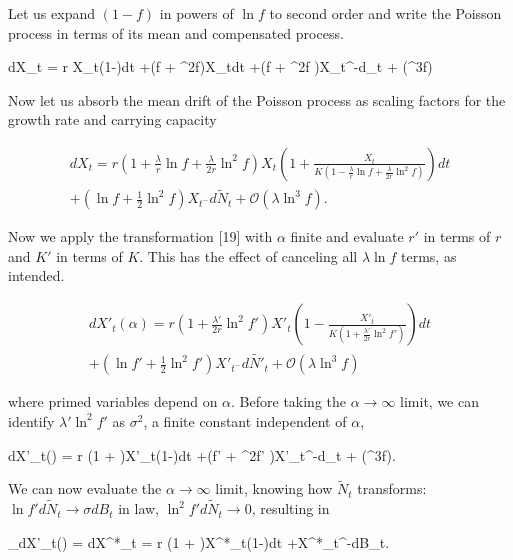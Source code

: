 \noindent Let us expand $(1-f)$ in powers of $\ln f$ to second order and write the Poisson process in terms of its mean and compensated process.

\be
dX_t = r X_t\left(1-\right)dt +\left(\ln f + \ln^2f\right)X_{t}\lambda dt +\left(\ln f + \ln^2f \right)X_{t^-}d_t + (\lambda\ln^3f)
\ee

\noindent Now let us absorb the mean drift of the Poisson process as scaling factors for the growth rate and carrying capacity

\begin{multline}
dX_t = r \left(1+\frac{\lambda}{r}\ln f + \frac{\lambda}{2r}\ln^2f \right)X_t\left(1+\frac{X_t}{K\left(1-\frac{\lambda}{r}\ln f+ \frac{\lambda}{2r}\ln^2f \right)}\right)dt \\ 
+\left(\ln f + \frac{1}{2}\ln^2f \right)X_{t^-}d\tilde{N}_t + \mathcal{O}(\lambda\ln^3f).
\end{multline}

Now we apply the transformation [19] with $\alpha$ finite and evaluate $r'$ in terms of $r$ and $K'$ in terms of $K$.  This has the effect of canceling all $\lambda\ln f$ terms, as intended.

\begin{multline}
dX'_t(\alpha) = r \left(1 + \frac{\lambda'}{2r}\ln^2f' \right)X'_t\left(1-\frac{X'_t}{K\left(1 + \frac{\lambda'}{2r}\ln^2f' \right)}\right)dt \\
+\left(\ln f' + \frac{1}{2}\ln^2f' \right)X'_{t^-}d\tilde{N'}_t + \mathcal{O}(\lambda\ln^3f)
\end{multline}

\noindent where primed variables depend on $\alpha$.  Before taking the $\alpha\to\infty$ limit, we can identify $\lambda'\ln^2f'$ as $\sigma^2$, a finite constant independent of $\alpha$,

\be
dX'_t(\alpha) = r \left(1 + \right)X'_t\left(1-\right)dt +\left(\ln f' + \ln^2f' \right)X'_{t^-}d_t + (\lambda\ln^3f).
\ee

\noindent We can now evaluate the $\alpha\to\infty$ limit, knowing how $\tilde{N}_t$ transforms:  $\ln f'd\tilde{N}_t\to\sigma dB_t$ in law, $\ln^2 f'd\tilde{N}_t\to 0$, resulting in

\be
\lim_{\alpha\to\infty}dX'_t(\alpha) = dX^*_t = r \left(1 + \right)X^*_t\left(1-\right)dt +\sigma X^*_{t^-}dB_t.
\ee

